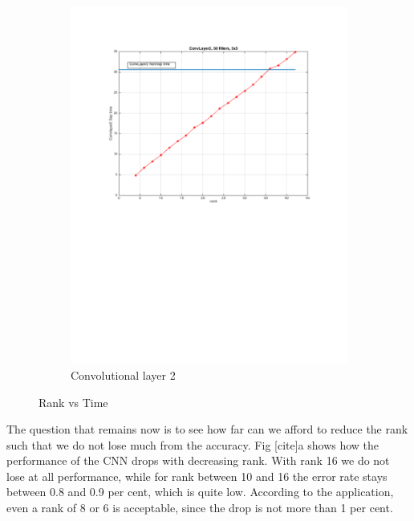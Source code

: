 \documentclass{article} %
\begin{document}
\begin{figure}[h]
\begin{subfigure}[b]{0.40\textwidth}
    \includegraphics[width=\textwidth]{images/imagesCNN_page3.pdf}
    \caption{Convolutional layer 2}
  \end{subfigure}
  \caption{Rank vs Time}
  \label{fig:cnn1time}
\end{figure}

The question that remains now is to see how far can we afford to reduce the rank such that we do not lose much from the accuracy. Fig [cite]a shows how the performance of the CNN drops with decreasing rank. With rank 16 we do not
lose at all performance, while for rank between 10 and 16 the error rate stays between 0.8 and 0.9 per cent, which is quite low. According to the application, even a rank of 8 or 6 is acceptable, since the drop is not more than 1 per cent.
\end{document}
